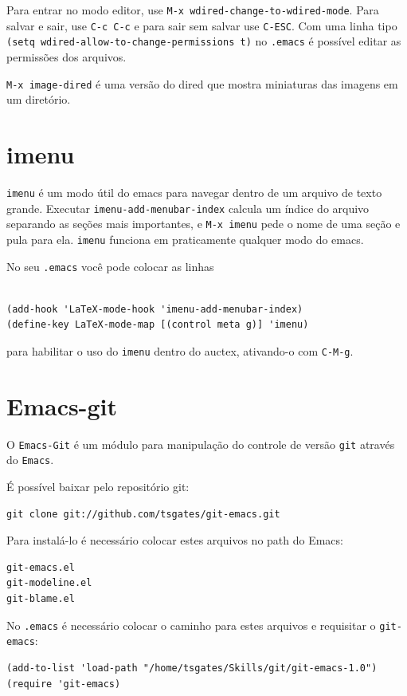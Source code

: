 \documentclass[12pt,brazil]{book}
\begin{document}
Para entrar no modo editor, use \texttt{M-x
  wdired-change-to-wdired-mode}. Para salvar e sair, use \texttt{C-c
  C-c} e para sair sem salvar use \texttt{C-ESC}. Com uma linha tipo
\texttt{(setq wdired-allow-to-change-permissions t)} no
\texttt{.emacs} é possível editar as permissões dos arquivos.

\texttt{M-x image-dired} é uma versão do dired que mostra miniaturas
das imagens em um diretório.

\section{imenu}
\label{sec:imenu}

\texttt{imenu} é um modo útil do emacs para navegar dentro de um
arquivo de texto grande. Executar \texttt{imenu-add-menubar-index}
calcula um índice do arquivo separando as seções mais importantes, e
\texttt{M-x imenu} pede o nome de uma seção e pula para
ela. \texttt{imenu} funciona em praticamente qualquer modo do emacs.

No seu \texttt{.emacs} você pode colocar as linhas
\begin{verbatim}

(add-hook 'LaTeX-mode-hook 'imenu-add-menubar-index)
(define-key LaTeX-mode-map [(control meta g)] 'imenu)

\end{verbatim}
para habilitar o uso do \texttt{imenu} dentro do auctex, ativando-o
com \texttt{C-M-g}.

\section{Emacs-git}
\label{sec:emacs-git}

O \texttt{Emacs-Git} é um módulo para manipulação do controle de
versão \texttt{git} através do \texttt{Emacs}.

É possível baixar pelo repositório git:

\begin{verbatim}
git clone git://github.com/tsgates/git-emacs.git
\end{verbatim}

Para instalá-lo é necessário colocar estes arquivos no path do Emacs:

\begin{verbatim}
git-emacs.el
git-modeline.el
git-blame.el
\end{verbatim}

No \texttt{.emacs} é necessário colocar o caminho para estes arquivos
e requisitar o \texttt{git-emacs}:
\begin{verbatim}
(add-to-list 'load-path "/home/tsgates/Skills/git/git-emacs-1.0")
(require 'git-emacs)
\end{verbatim}
\end{document}
